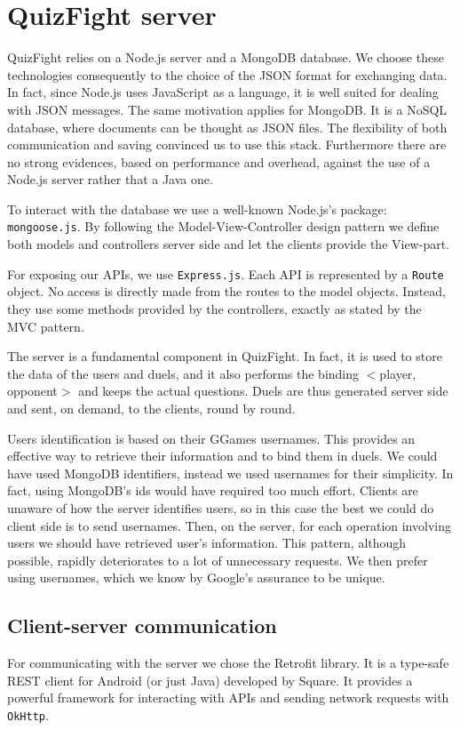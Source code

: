 \section{QuizFight server}

QuizFight relies on a Node.js server and a MongoDB database.
We choose these technologies consequently to the choice of the JSON format for
exchanging data.
In fact, since Node.js uses JavaScript as a language, it is well suited for
dealing with JSON messages.
The same motivation applies for MongoDB. It is a NoSQL database, where
documents can be thought as JSON files.
The flexibility of both communication and saving convinced us to use this
stack.
Furthermore there are no strong evidences, based on performance and overhead,
against the use of a Node.js server rather that a Java one. 

To interact with the database we use a well-known Node.js's package:
\texttt{mongoose.js}.
By following the Model-View-Controller design pattern we define both
models and controllers server side and let the clients provide the View-part.

For exposing our APIs, we use \texttt{Express.js}.
Each API is represented by a \texttt{Route} object.
No access is directly made from the routes to the model objects.
Instead, they use some methods provided by the controllers, exactly as stated
by the MVC pattern.

The server is a fundamental component in QuizFight. In fact, it is used to
store the data of the users and duels, and it also performs the binding
$<$player, opponent$>$ and keeps the actual questions.
Duels are thus generated server side and sent, on demand, to the clients,
round by round.

Users identification is based on their GGames usernames.
This provides an effective way to retrieve their information and to bind
them in duels.
We could have used MongoDB identifiers, instead we used usernames for their
simplicity.
In fact, using MongoDB's ids would have required too much effort.
Clients are unaware of how the server identifies users, so in this case the
best we could do client side is to send usernames.
Then, on the server, for each operation involving users we should have
retrieved user's information.
This pattern, although possible, rapidly deteriorates to a lot of unnecessary
requests.
We then prefer using usernames, which we know by Google's assurance to be
unique.

\subsection{Client-server communication}
For communicating with the server we chose the Retrofit library. It is a 
type-safe REST client for Android (or just Java) developed by Square. 
It provides a powerful framework for interacting with APIs and sending 
network requests with \texttt{OkHttp}.

